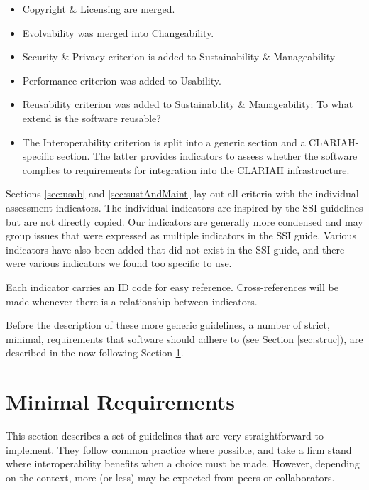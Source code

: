 \documentclass[a4paper,11pt]{article}
\begin{document}
\begin{itemize}
\item Copyright \& Licensing are merged.
\item Evolvability was merged into Changeability.
\item Security \& Privacy criterion is added to Sustainability \& Manageability
\item Performance criterion was added to Usability.
\item Reusability criterion was added to Sustainability \& Manageability: To what extend is the software reusable?
%
%
%
\item The Interoperability criterion is split into a generic section and a CLARIAH-specific section. The latter provides indicators to assess
whether the software complies to requirements for integration into the CLARIAH infrastructure.
\end{itemize}

Sections \ref{sec:usab} and \ref{sec:sustAndMaint} lay out all criteria with the individual assessment
indicators. The individual indicators are inspired by the SSI guidelines but
are not directly copied. Our indicators are generally more condensed and may
group issues that were expressed as multiple indicators in the SSI guide.
Various indicators have also been added that did not exist in the SSI guide,
and there were various indicators we found too specific to use.

Each indicator carries an ID code for easy reference. Cross-references will be
made whenever there is a relationship between indicators.

Before the description of these more generic guidelines, a number of strict, minimal, requirements that software should adhere to (see Section \ref{sec:struc}), are described in the now following Section \ref{sec:req}.

\section{Minimal Requirements}\label{sec:req}

This section describes a set of guidelines that are very straightforward to
implement. They follow common practice where possible, and take a firm stand
where interoperability benefits when a choice must be made. However, depending
on the context, more (or less) may be expected from peers or collaborators.
\end{document}

